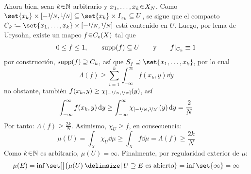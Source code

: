 \begin{sol}
\begin{enumerate}[label=(\roman*),leftmargin=1.5em]
Ahora bien, sean $k\en\mathbb{N}$ arbitrario y $x_1,\dots,x_k\en X_N$. Como $\set{x_k} \times [-\nicefrac{1}{N},\nicefrac{1}{N}] \subseteq \set{x_k} \times I_{x_k} \subseteq U$, se sigue que el compacto $C_k \coloneq \set{x_1,\dots,x_k} \times [-\nicefrac{1}{N},\nicefrac{1}{N}]$ está contenido en $U$. Luego, por lema de Urysohn, existe un mapeo $f \en C_c(X)$ tal que
\[
0 \leq f \leq 1,
\qquad
\operatorname{supp}(f) \subseteq U
\qquad\text{y}\qquad
f|_{C_k} \equiv 1
\]
por construcción, $\operatorname{supp}(f) \supseteq C_k$, así que $S_{f} \supseteq \set{x_1,\dots,x_k}$, por lo cual
\[
\Lambda(f) \ge \sum^k_{i=1} \int^\infty_{-\infty}f(x_k,y) \dd{y}
\]
no obstante, también $f(x_k,y) \ge \chi_{[-\nicefrac{1}{N},\nicefrac{1}{N}]}(y)$, así 
\[
\int^\infty_{-\infty}f(x_k,y) \dd{y} 
\ge \int^\infty_{-\infty}\chi_{[-\nicefrac{1}{N},\nicefrac{1}{N}]}(y) \dd{y} 
= \frac{2}{N}
\] 
Por tanto: $\Lambda(f) \ge \frac{2k}{N}$. Asimismo, $\chi_U \ge f$, en consecuencia:
\[
\mu(U) 
= \int_X \chi_U \dd{\mu}
\ge \int_X f \dd{\mu}
= \Lambda(f)
\ge \frac{2k}{N}
\]
Como $k\en\mathbb{N}$ es arbitrario, $\mu(U) = \infty$. Finalmente, por regularidad exterior de $\mu$:
\[
\mu(E) 
= \inf\set[\big]{ \mu(U) \given U\supseteq E \text{ es abierto} }
= \inf\set{\infty} = \infty
\]
\end{enumerate}
\end{sol}